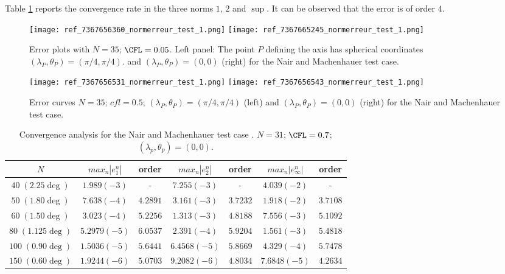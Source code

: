 Table \ref{table:2.4} reports the convergence rate 
in the three norms $1$, $2$ and $\sup$. It can be observed
that the error is of order $4$. 

\begin{figure}[ht!]
\texttt{[image: ref\_7367656360\_normerreur\_test\_1.png]}
\texttt{[image: ref\_7367665245\_normerreur\_test\_1.png]}
\label{erreur_cfl=0.05}
\caption{Error plots with $N=35$; $\CFL=0.05$. Left panel: 
The point $P$ defining the axis has spherical coordinates  $(\lambda_P,  \theta_P) = (\pi / 4, \pi / 4)$. and $(\lambda_P, \theta_P) = (0,0)$ (right) for the Nair and Machenhauer test case.}
\end{figure}

\begin{figure}[ht!]
\texttt{[image: ref\_7367656531\_normerreur\_test\_1.png]}
\texttt{[image: ref\_7367656543\_normerreur\_test\_1.png]}
\label{erreur_cfl=0.5}
\caption{Error curves $N=35$; $cfl=0.5$; $(\lambda_P,  \theta_P) = (\pi / 4, \pi / 4)$ (left) and $(\lambda_P, \theta_P) = (0,0)$ (right) for the Nair and Machenhauer test case.}
\end{figure}

\begin{table}[ht!]
\label{table:2.4}
\begin{tabular}{|c||cc|cc|cc|}
\hline
$N$ & $max_n |e_1^n|$ & order  & $max_n |e_2^n|$ & order  & $max_n |e_{\infty}^n|$ & order \\
\hline
\hline
$40\;(2.25\deg)$ & $1.989 (-3)$ & -  & $7.255 (-3)$ & - & $4.039(-2)$  & - \\
\hline 
$50\;(1.80\deg)$ & $7.638 (-4)$ & $4.2891$ & $3.161(-3)$ & $3.7232$ & $1.918 (-2)$ & $3.7108$ \\
\hline
$60\;(1.50\deg)$ & $3.023(-4)$ & $5.2256$ & $1.313 (-3)$ & $4.8188$ & $7.556 (-3)$ & $5.1092$ \\
\hline
$80\;(1.125\deg)$ & $5.2979 (-5)$ & $6.0537$ & $2.391(-4)$ & $5.9204$ & $1.561(-3)$ & $5.4818$ \\
\hline
$100\;(0.90\deg)$ & $1.5036(-5)$ & $5.6441$ & $6.4568(-5)$ & $5.8669$ & $4.329(-4)$ & $5.7478$\\
\hline
$150\;(0.60\deg)$ & $1.9244(-6)$ & $5.0703$ & $9.2082(-6)$ & $4.8034$ & $7.6848(-5)$ & $4.2634$\\
\hline
\end{tabular}
\caption{Convergence analysis for the Nair and Machenhauer test case \cite{Nair-Machenhauer}. 
$N=31$; $\CFL = 0.7$; $(\lambda_p, \theta_p) = (0,0)$.}
\end{table}

